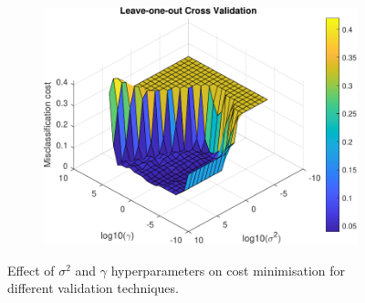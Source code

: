 \documentclass{article}
\begin{document}
\begin{figure}[h]
\begin{subfigure}[b]{0.45\textwidth}
                 \label{fig:10_fold_validation}
             \end{subfigure}
             \hfill
             \begin{subfigure}[b]{0.45\textwidth}
                 \centering
                 \includegraphics[width=\textwidth]{Assignment 1/figures/loo_cross_validation_surf.pdf}
                 \label{fig:loo_validation}
             \end{subfigure}
            \caption{Effect of $\sigma^2$ and $\gamma$ hyperparameters on cost minimisation for different validation techniques. }
        \end{figure}
            
            
\end{document}
